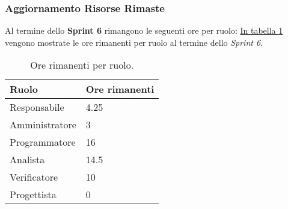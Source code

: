 \subsubsection{Aggiornamento Risorse Rimaste}
\label{sec:AggiornamentoRisorse_Sprint6}
Al termine dello \textbf{Sprint 6} rimangono le seguenti ore per ruolo: \hyperref[tab:sprint6_ore_rimanenti]{In tabella \ref{tab:sprint6_ore_rimanenti}} vengono mostrate le ore rimanenti per ruolo al termine dello \textit{Sprint 6}.

\begin{table}[H]
    \centering
    \begin{tabular}{| l | l |}
    \hline
    \textbf{Ruolo} & 
    \textbf{Ore rimanenti}\\
    \hline
        Responsabile & 4.25\\
    \hline
        Amministratore & 3\\
    \hline
        Programmatore & 16\\
    \hline
        Analista & 14.5\\
    \hline
        Verificatore & 10\\
    \hline
        Progettista & 0\\
    \hline
    \end{tabular}
    \caption{Ore rimanenti per ruolo.}
    \label{tab:sprint6_ore_rimanenti} 
\end{table}